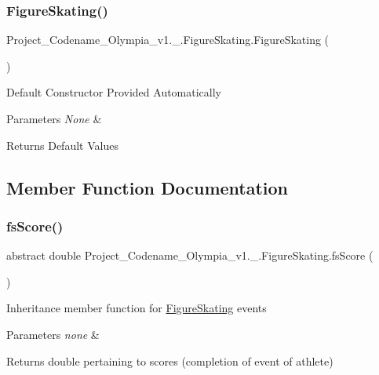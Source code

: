\subsubsection{\texorpdfstring{Figure\+Skating()}{FigureSkating()}}
{\footnotesize\ttfamily Project\+\_\+\+Codename\+\_\+\+Olympia\+\_\+v1.\+\_.\+Figure\+Skating.\+Figure\+Skating (\begin{DoxyParamCaption}{ }\end{DoxyParamCaption})\hspace{0.3cm}{\ttfamily [inline]}}

Default Constructor Provided Automatically 
\begin{DoxyParams}{Parameters}
{\em None} & \\
\hline
\end{DoxyParams}
\begin{DoxyReturn}{Returns}
Default Values 
\end{DoxyReturn}


\subsection{Member Function Documentation}
\mbox{\label{classProject__Codename__Olympia__v1_1_1__0_1_1FigureSkating_a437e794fec382863421f8c65e31295f8}} 
\subsubsection{\texorpdfstring{fs\+Score()}{fsScore()}}
{\footnotesize\ttfamily abstract double Project\+\_\+\+Codename\+\_\+\+Olympia\+\_\+v1.\+\_.\+Figure\+Skating.\+fs\+Score (\begin{DoxyParamCaption}{ }\end{DoxyParamCaption})\hspace{0.3cm}{\ttfamily [pure virtual]}}

Inheritance member function for \hyperlink{classProject__Codename__Olympia__v1_1_1__0_1_1FigureSkating}{Figure\+Skating} events 
\begin{DoxyParams}{Parameters}
{\em none} & \\
\hline
\end{DoxyParams}
\begin{DoxyReturn}{Returns}
double pertaining to scores (completion of event of athlete) 
\end{DoxyReturn}


